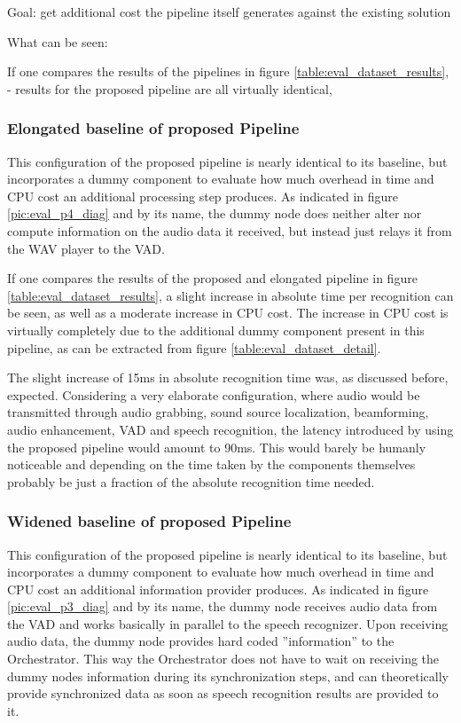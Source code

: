 Goal: get additional cost the pipeline itself generates against the existing solution

What can be seen: 

If one compares the results of the pipelines in figure \ref{table:eval_dataset_results}, 
- results for the proposed pipeline are all virtually identical, 


\subsubsection{Elongated baseline of proposed Pipeline}
This configuration of the proposed pipeline is nearly identical to its baseline, but incorporates a dummy component to evaluate how much overhead in time and CPU cost an additional processing step produces.
As indicated in figure \ref{pic:eval_p4_diag} and by its name, the dummy node does neither alter nor compute information on the audio data it received, but instead just relays it from the WAV player to the VAD.

If one compares the results of the proposed and elongated pipeline in figure \ref{table:eval_dataset_results}, a slight increase in absolute time per recognition can be seen, as well as a moderate increase in CPU cost.
The increase in CPU cost is virtually completely due to the additional dummy component present in this pipeline, as can be extracted from figure \ref{table:eval_dataset_detail}. 

The slight increase of 15ms in absolute recognition time was, as discussed before, expected.
Considering a very elaborate configuration, where audio would be transmitted through audio grabbing, sound source localization, beamforming, audio enhancement, VAD and speech recognition, the latency introduced by using the proposed pipeline would amount to 90ms.
This would barely be humanly noticeable and depending on the time taken by the components themselves probably be just a fraction of the absolute recognition time needed.


\subsubsection{Widened baseline of proposed Pipeline}
This configuration of the proposed pipeline is nearly identical to its baseline, but incorporates a dummy component to evaluate how much overhead in time and CPU cost an additional information provider produces.
As indicated in figure \ref{pic:eval_p3_diag} and by its name, the dummy node receives audio data from the VAD and works basically in parallel to the speech recognizer.
Upon receiving audio data, the dummy node provides hard coded ''information'' to the Orchestrator.
This way the Orchestrator does not have to wait on receiving the dummy nodes information during its synchronization steps, and can theoretically provide synchronized data as soon as speech recognition results are provided to it.

